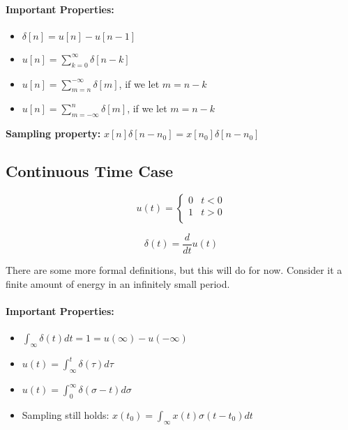 \documentclass[a4paper,12pt]{report}
\begin{document}
\paragraph{Important Properties: } 
\begin{itemize}
\item $\delta[n] = u[n] - u[n-1]$
\item $u[n] = \sum_{k=0}^\infty \delta[n-k]$
\item $u[n] = \sum_{m=n}^{-\infty} \delta[m]$, if we let $m = n-k$
\item $u[n] = \sum_{m=-\infty}^n \delta[m]$, if we let $m = n-k$
\end{itemize}

\textbf{Sampling property: } $x[n] \delta[n-n_0] = x[n_0] \delta[n-n_0]$

\subsection{Continuous Time Case}

\begin{equation}
u(t) = 
\begin{cases}
	0 & t < 0 \\
	1 & t > 0 \\
\end{cases}
\end{equation}

\begin{equation}
\delta(t) = \frac{d}{dt} u(t)
\end{equation}

There are some more formal definitions, but this will do for now. Consider it a finite amount of energy in an infinitely small period. 

\paragraph{Important Properties: } 

\begin{itemize}
\item $\int_{\infty} \delta(t) dt = 1 = u(\infty) - u(-\infty)$
\item $u(t) = \int_{\infty}^{t} \delta(\tau) d\tau$
\item $u(t) = \int_{0}^{\infty} \delta(\sigma - t) d\sigma$
\item Sampling still holds: $x(t_0) = \int_{\infty} x(t) \sigma(t-t_0) dt$
\end{itemize}
\end{document}
